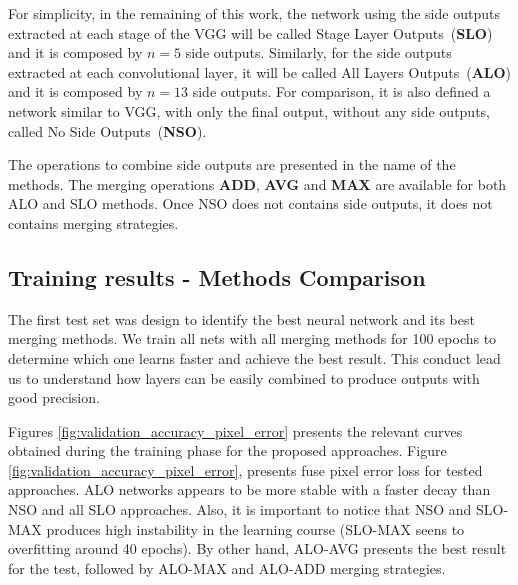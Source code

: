 For simplicity, in the remaining of this work, the network using the side outputs extracted at each stage of the VGG will be called Stage Layer Outputs~(\textbf{SLO}) and it is composed by $n=5$ side outputs. Similarly, for the side outputs extracted at each convolutional layer, it will be called All Layers Outputs~(\textbf{ALO}) and it is composed by $n=13$ side outputs. For comparison, it is also defined a network similar to VGG, with only the final output, without any side outputs, called No Side Outputs~(\textbf{NSO}).

The operations to combine side outputs are presented in the name of the methods. The merging operations \textbf{ADD}, \textbf{AVG} and \textbf{MAX} are available for both ALO and SLO methods. Once NSO does not contains side outputs, it does not contains merging strategies.

\subsection{Training results - Methods Comparison}

The first test set was design to identify the best neural network and its best merging methods. We train all nets with all merging methods for 100 epochs to determine which one learns faster and achieve the best result. This conduct lead us to understand how layers can be easily combined to produce outputs with good precision.

Figures \ref{fig:validation_accuracy_pixel_error} presents the relevant curves obtained during the training phase for the proposed approaches. Figure \ref{fig:validation_accuracy_pixel_error}, presents fuse pixel error loss for tested approaches. ALO networks appears to be more stable with a faster decay than NSO and all SLO approaches. Also, it is important to notice that NSO and SLO-MAX produces high instability in the learning course (SLO-MAX seens to overfitting around 40 epochs). By other hand, ALO-AVG presents the best result for the test, followed by ALO-MAX and ALO-ADD merging strategies.

